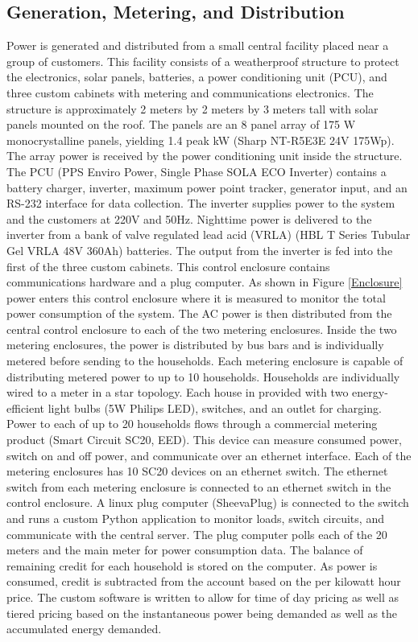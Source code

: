 \documentclass[conference]{IEEEtran}
\begin{document}
\subsection{Generation, Metering, and Distribution}
Power is generated and distributed from a small central facility placed
near a group of customers.
This facility consists of a weatherproof structure to protect the
electronics, solar panels, batteries, a power conditioning unit (PCU),
and three custom cabinets with metering and communications electronics.
The structure is approximately 2 meters by 2 meters by 3 meters tall
with solar panels mounted on the roof.
The panels are an 8 panel array of 175 W monocrystalline panels, yielding
1.4 peak kW (Sharp NT-R5E3E 24V 175Wp).
The array power is received by the power conditioning unit inside the
structure.
The PCU (PPS Enviro Power, Single Phase SOLA ECO Inverter) contains a
battery charger, inverter, maximum power point tracker, generator input,
and an RS-232 interface for data collection.
The inverter supplies power to the system and the customers at 220V and
50Hz.
Nighttime power is delivered to the inverter from a bank of valve
regulated lead acid (VRLA) (HBL T Series Tubular Gel VRLA 48V 360Ah)
batteries.
The output from the inverter is fed into the first of the three custom
cabinets.  This control enclosure contains communications hardware and a
plug computer.
As shown in Figure \ref{Enclosure} power enters this control enclosure
where it is measured to monitor the total power consumption of the
system.
The AC power is then distributed from the central control enclosure to
each of the two metering enclosures.
Inside the two metering enclosures, the power is distributed by bus bars
and is individually metered before sending to the households.
Each metering enclosure is capable of distributing metered power to up
to 10 households.
Households are individually wired to a meter in a star topology.
Each house in provided with two energy-efficient light bulbs (5W Philips
LED), switches, and an outlet for charging.
Power to each of up to 20 households flows through a commercial metering
product (Smart Circuit SC20, EED).
This device can measure consumed power, switch on and off power, and
communicate over an ethernet interface.
Each of the metering enclosures has 10 SC20 devices on an ethernet switch.
The ethernet switch from each metering enclosure is connected to an
ethernet switch in the control enclosure.
A linux plug computer (SheevaPlug) is connected to the switch and runs a
custom Python application to monitor loads, switch circuits, and
communicate with the central server.
The plug computer polls each of the 20 meters and the main meter for
power consumption data.
The balance of remaining credit for each household is stored on the computer.
As power is consumed, credit is subtracted from the account based on the
per kilowatt hour price.
The custom software is written to allow for time of day pricing as well
as tiered pricing based on the instantaneous power being demanded as
well as the accumulated energy demanded.
\end{document}
